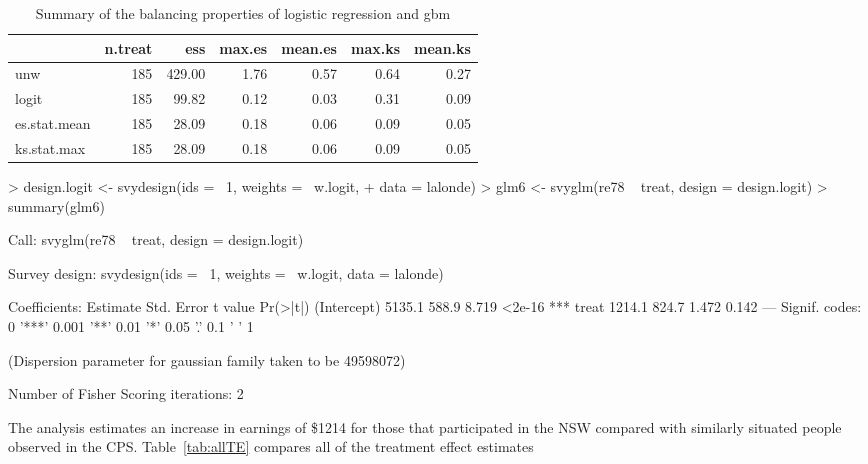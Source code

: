 \documentclass{article}
\begin{document}
\begin{table}[ht]
\begin{center}
\begin{tabular}{lrrrrrr}
\hline
 & n.treat & ess & max.es & mean.es & max.ks & mean.ks \\
\hline
unw & 185 & 429.00 & 1.76 & 0.57 & 0.64 & 0.27 \\
logit & 185 & 99.82 & 0.12 & 0.03 & 0.31 & 0.09 \\
es.stat.mean & 185 & 28.09 & 0.18 & 0.06 & 0.09 & 0.05 \\
ks.stat.max & 185 & 28.09 & 0.18 & 0.06 & 0.09 & 0.05 \\
\hline
\end{tabular}
\caption{Summary of the balancing properties of logistic regression and gbm}
\label{tab:balancecompare}
\end{center}
\end{table}
\begin{Schunk}
\begin{Sinput}
> design.logit <- svydesign(ids = ~1, weights = ~w.logit, 
+     data = lalonde)
> glm6 <- svyglm(re78 ~ treat, design = design.logit)
> summary(glm6)
\end{Sinput}
\begin{Soutput}
Call:
svyglm(re78 ~ treat, design = design.logit)

Survey design:
svydesign(ids = ~1, weights = ~w.logit, data = lalonde)

Coefficients:
            Estimate Std. Error t value Pr(>|t|)    
(Intercept)   5135.1      588.9   8.719   <2e-16 ***
treat         1214.1      824.7   1.472    0.142    
---
Signif. codes:  0 '***' 0.001 '**' 0.01 '*' 0.05 '.' 0.1 ' ' 1 

(Dispersion parameter for gaussian family taken to be 49598072)

Number of Fisher Scoring iterations: 2
\end{Soutput}
\end{Schunk}



The analysis estimates an increase in earnings of
\$1214 for those that participated in the NSW compared
with similarly situated people observed in the CPS. Table~\ref{tab:allTE}
compares all of the treatment effect estimates
\end{document}

